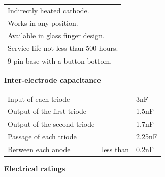 \documentclass[12pt]{article}
\makeatletter
\renewcommand \dotfill {\leavevmode \cleaders \hb@xt@ 5mm{\hss .\hss }\hfill \kern \z@}
\makeatother
\begin{document}
    \vspace{70mm}
    
    \begin{tabular}{l@{}}
        Indirectly heated cathode. \\
        Works in any position. \\
        Available in glass finger design. \\
        Service life not less than 500 hours. \\
        9-pin base with a button bottom. \\
    \end{tabular}
    
    \vspace{3mm}
    \hspace{-7mm} \textbf{Inter-electrode capacitance}
    \vspace{3mm}
    
    \begin{tabular}{p{105mm}l@{}l}
        Input of each triode \hspace{-2.7mm} \dotfill & & 3nF \\
        Output of the first triode \hspace{-2.3mm} \dotfill & & 1.5nF \\
        Output of the second triode \hspace{-2.1mm} \dotfill & & 1.7nF \\
        Passage of each triode \hspace{-1.7mm} \dotfill & & 2.25nF \\
        Between each anode \hspace{-3.1mm} \dotfill & \hspace{-1.0mm} less than \hspace{1mm} & 0.2nF \\
    \end{tabular}
    
    \vspace{3mm}
    \hspace{-7mm} \textbf{Electrical ratings}
    \vspace{3mm}
    
\end{document}
